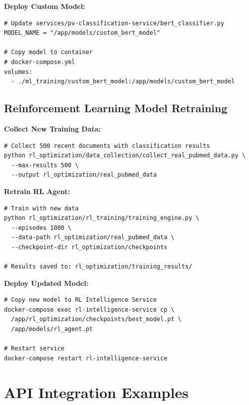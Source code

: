 \textbf{Deploy Custom Model:}
\begin{lstlisting}[style=pythonstyle]
# Update services/pv-classification-service/bert_classifier.py
MODEL_NAME = "/app/models/custom_bert_model"

# Copy model to container
# docker-compose.yml
volumes:
  - ./ml_training/custom_bert_model:/app/models/custom_bert_model
\end{lstlisting}

\subsection{Reinforcement Learning Model Retraining}

\textbf{Collect New Training Data:}
\begin{commandbox}
\begin{lstlisting}[style=bashstyle]
# Collect 500 recent documents with classification results
python rl_optimization/data_collection/collect_real_pubmed_data.py \
  --max-results 500 \
  --output rl_optimization/real_pubmed_data
\end{lstlisting}
\end{commandbox}

\textbf{Retrain RL Agent:}
\begin{commandbox}
\begin{lstlisting}[style=bashstyle]
# Train with new data
python rl_optimization/rl_training/training_engine.py \
  --episodes 1000 \
  --data-path rl_optimization/real_pubmed_data \
  --checkpoint-dir rl_optimization/checkpoints

# Results saved to: rl_optimization/training_results/
\end{lstlisting}
\end{commandbox}

\textbf{Deploy Updated Model:}
\begin{commandbox}
\begin{lstlisting}[style=bashstyle]
# Copy new model to RL Intelligence Service
docker-compose exec rl-intelligence-service cp \
  /app/rl_optimization/checkpoints/best_model.pt \
  /app/models/rl_agent.pt

# Restart service
docker-compose restart rl-intelligence-service
\end{lstlisting}
\end{commandbox}

\section{API Integration Examples}

